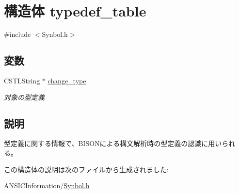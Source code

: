 \hypertarget{structtypedef__table}{
\section{構造体 typedef\_\-table}
\label{structtypedef__table}
}


{\ttfamily \#include $<$Synbol.h$>$}

\subsection*{変数}
\begin{DoxyCompactItemize}
\item 
\hypertarget{structtypedef__table_a4afc97b97fbd4fc47fdc746bfce061f2}{
CSTLString $\ast$ \hyperlink{structtypedef__table_a4afc97b97fbd4fc47fdc746bfce061f2}{change\_\-type}}
\label{structtypedef__table_a4afc97b97fbd4fc47fdc746bfce061f2}

\begin{DoxyCompactList}\small\item\em 対象の型定義 \item\end{DoxyCompactList}\end{DoxyCompactItemize}


\subsection{説明}
型定義に関する情報で、BISONによる構文解析時の型定義の認識に用いられる。 

この構造体の説明は次のファイルから生成されました:\begin{DoxyCompactItemize}
\item 
ANSICInformation/\hyperlink{Synbol_8h}{Synbol.h}\end{DoxyCompactItemize}
